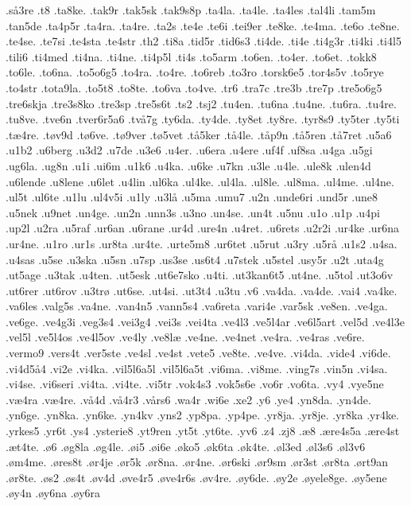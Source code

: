 {.så3re
.t8
.ta8ke.
.tak9r
.tak5sk
.tak9s8p
.ta4la.
.ta4le.
.ta4les
.tal4li
.tam5m
.tan5de
.ta4p5r
.ta4ra.
.ta4re.
.ta2s
.te4e
.te6i
.tei9er
.te8ke.
.te4ma.
.te6o
.te8ne.
.te4se.
.te7si
.te4sta
.te4str
.th2
.ti8a
.tid5r
.tid6s3
.ti4de.
.ti4e
.ti4g3r
.ti4ki
.ti4l5
.tili6
.ti4med
.ti4na.
.ti4ne.
.ti4p5l
.ti4s
.to5arm
.to6en.
.to4er.
.to6et.
.tokk8
.to6le.
.to6na.
.to5o6g5
.to4ra.
.to4re.
.to6reb
.to3ro
.torsk6e5
.tor4s5v
.to5rye
.to4str
.tota9la.
.to5t8
.to8te.
.to6va
.to4ve.
.tr6
.tra7c
.tre3b
.tre7p
.tre5o6g5
.tre6skja
.tre3s8ko
.tre3sp
.tre5s6t
.ts2
.tsj2
.tu4en.
.tu6na
.tu4ne.
.tu6ra.
.tu4re.
.tu8ve.
.tve6n
.tver6r5a6
.två7g
.ty6da.
.ty4de.
.ty8et
.ty8re.
.tyr8s9
.ty5ter
.ty5ti
.tæ4re.
.tøv9d
.tø6ve.
.tø9ver
.tø5vet
.tå5ker
.tå4le.
.tåp9n
.tå5ren
.tå7ret
.u5a6
.u1b2
.u6berg
.u3d2
.u7de
.u3e6
.u4er.
.u6era
.u4ere
.uf4f
.uf8sa
.u4ga
.u5gi
.ug6la.
.ug8n
.u1i
.ui6m
.u1k6
.u4ka.
.u6ke
.u7kn
.u3le
.u4le.
.ule8k
.ulen4d
.u6lende
.u8lene
.u6let
.u4lin
.ul6ka
.ul4ke.
.ul4la.
.ul8le.
.ul8ma.
.ul4me.
.ul4ne.
.ul5t
.ul6te
.u1lu
.ul4v5i
.u1ly
.u3lå
.u5ma
.umu7
.u2n
.unde6ri
.und5r
.une8
.u5nek
.u9net
.un4ge.
.un2n
.unn3s
.u3no
.un4se.
.un4t
.u5nu
.u1o
.u1p
.u4pi
.up2l
.u2ra
.u5raf
.ur6an
.u6rane
.ur4d
.ure4n
.u4ret.
.u6rets
.u2r2i
.ur4ke
.ur6na
.ur4ne.
.u1ro
.ur1s
.ur8ta
.ur4te.
.urte5m8
.ur6tet
.u5rut
.u3ry
.u5rå
.u1s2
.u4sa.
.u4sas
.u5se
.u3ska
.u5sn
.u7sp
.us3se
.us6t4
.u7stek
.u5stel
.usy5r
.u2t
.uta4g
.ut5age
.u3tak
.u4ten.
.ut5esk
.ut6e7sko
.u4ti.
.ut3kan6t5
.ut4ne.
.u5tol
.ut3o6v
.ut6rer
.ut6rov
.u3trø
.ut6se.
.ut4si.
.ut3t4
.u3tu
.v6
.va4da.
.va4de.
.vai4
.va4ke.
.va6les
.valg5s
.va4ne.
.van4n5
.vann5s4
.va6reta
.vari4e
.var5sk
.ve8en.
.ve4ga.
.ve6ge.
.ve4g3i
.veg3s4
.vei3g4
.vei3s
.vei4ta
.ve4l3
.ve5l4ar
.ve6l5art
.vel5d
.ve4l3e
.vel5l
.ve5l4os
.ve4l5ov
.ve4ly
.ve8læ
.ve4ne.
.ve4net
.ve4ra.
.ve4ras
.ve6re.
.vermo9
.vers4t
.ver5ste
.ve4sl
.ve4st
.vete5
.ve8te.
.ve4ve.
.vi4da.
.vide4
.vi6de.
.vi4d5å4
.vi2e
.vi4ka.
.vil5l6a5l  
.vil5l6a5t
.vi6ma.
.vi8me.
.ving7s
.vin5n
.vi4sa.
.vi4se.
.vi6seri
.vi4ta.
.vi4te.
.vi5tr
.vok4s3
.vok5s6e
.vo6r
.vo6ta.
.vy4
.vye5ne
.væ4ra
.væ4re.
.vå4d
.vå4r3
.vårs6
.wa4r
.wi6e
.xe2
.y6
.ye4
.yn8da.
.yn4de.
.yn6ge.
.yn8ka.
.yn6ke.
.yn4kv
.yns2
.yp8pa.
.yp4pe.
.yr8ja.
.yr8je.
.yr8ka
.yr4ke.
.yrkes5
.yr6t
.ys4
.ysterie8
.yt9ren
.yt5t
.yt6te.
.yv6
.z4
.zj8
.æ8
.ære4s5a
.ære4st
.æt4te.
.ø6
.øg8la
.øg4le.
.øi5
.øi6e
.øko5
.øk6ta
.øk4te.
.øl3ed
.øl3s6
.øl3v6
.øm4me.
.øres8t
.ør4je
.ør5k
.ør8na.
.ør4ne.
.ør6ski
.ør9sm
.ør3st
.ør8ta
.ørt9an
.ør8te.
.øs2
.øs4t
.øv4d
.øve4r5
.øve4r6s
.øv4re.
.øy6de.
.øy2e
.øyele8ge.
.øy5ene
.øy4n
.øy6na
.øy6ra
}

